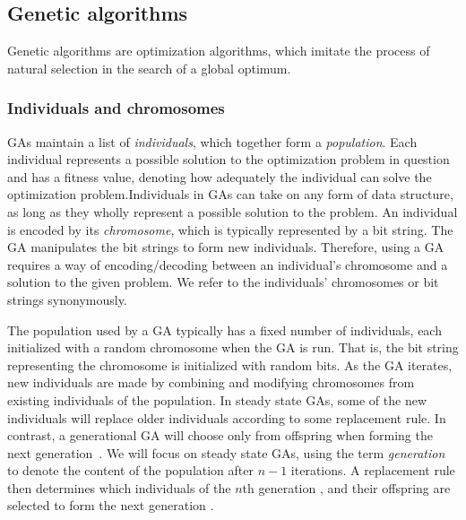 \subsection{Genetic algorithms} 
Genetic algorithms are optimization algorithms, which imitate the process of natural selection in the search of a global optimum.

\subsubsection{Individuals and chromosomes}
GAs maintain a list of \emph{individuals}, which together form a \emph{population}. Each individual represents a possible solution to the optimization problem in question and has a fitness value, denoting how adequately the individual can solve the optimization problem.Individuals in GAs can take on any form of data structure, as long as they wholly represent a possible solution to the problem. An individual is encoded by its \emph{chromosome}, which is typically represented by a bit string. The GA manipulates the bit strings to form new individuals. Therefore, using a GA requires a way of encoding/decoding between an individual's chromosome and a solution to the given problem. We refer to the individuals' chromosomes or bit strings synonymously.

The population used by a GA typically has a fixed number of individuals, each initialized with a random chromosome when the GA is run. That is, the bit string representing the chromosome is initialized with random bits. As the GA iterates, new individuals are made by combining and modifying chromosomes from existing individuals of the population. In steady state GAs, some of the new individuals will replace older individuals according to some replacement rule. In contrast, a generational GA will choose only from offspring when forming the next generation~\cite{fogarty, Syswerda:1989:UCG:645512.657265, Whitley:1989:GAS:93126.93169}. We will focus on steady state GAs, using the term \emph{generation}  to denote the content of the population after $n - 1$ iterations. A replacement rule then determines which individuals of the $n$th generation , and their offspring  are selected to form the next generation .



